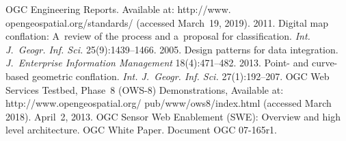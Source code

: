   \begin{multicols}{2}

\renewcommand{\bibname}{\protect\rmfamily References}

{\small\frenchspacing
 {%
 \begin{thebibliography}{99}
OGC Engineering Reports. 
Available at: {\sf http://www. opengeospatial.org/standards/} (accessed March~19, 2019).
 2011. Digital map conflation: A~review of the process and 
a~proposal for classification. \textit{Int. J.~Geogr. Inf. Sci.} 25(9):1439--1466.
 2005. Design patterns for data integration. 
\textit{J.~Enterprise 
Information Management} 18(4):471--482.
 2013. 
Point- and curve-based geometric conflation. \textit{Int. J.~Geogr. Inf. Sci.} 
27(1):192--207.
OGC Web Services Testbed, Phase~8 (OWS-8) Demonstrations, 
Available at: {\sf http://www.opengeospatial.org/ pub/www/ows8/index.html} (accessed 
March 2018).
April~2, 2013. OGC Sensor Web Enablement (SWE): Overview and high level 
architecture. OGC White Paper. Document OGC 07-165r1.


\end{thebibliography}}}
\end{multicols}
